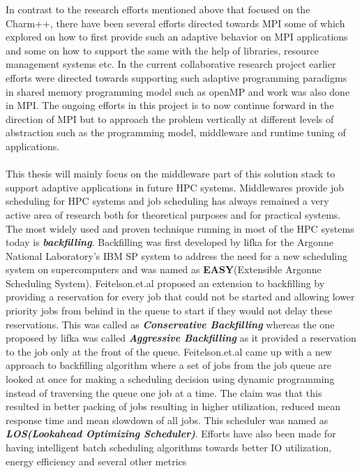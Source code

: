 In contrast to the research efforts mentioned above that focused on the Charm++, there have been several efforts directed towards MPI\cite{georgiou}\cite{travis}\cite{gladys}\cite{gonzalo}\cite{martin}\cite{gonzalo} some of which explored on how to first provide such an adaptive behavior on MPI applications and some on how to support the same with the help of libraries, resource management systems\cite{klein} etc. In the current collaborative research project earlier efforts were directed towards supporting such adaptive programming paradigms in shared memory programming model such as openMP\cite{andreas} and work was also done in MPI\cite{isaias}. The ongoing efforts in this project is to now continue forward in the direction of MPI but to approach the problem vertically at different levels of abstraction such as the programming model, middleware and runtime tuning of applications.\\ \\
This thesis will mainly focus on the middleware part of this solution stack to support adaptive applications in future HPC systems. Middlewares provide job scheduling for HPC systems and job scheduling has always remained a very active area of research both for theoretical purposes and for practical systems. The most widely used and proven technique running in most of the HPC systems today is \textbf{\textit{backfilling}}. Backfilling was first developed by lifka\cite{david} for the Argonne National Laboratory's IBM SP system to address the need for a new scheduling system on supercomputers and was named as \textbf{EASY}(Extensible Argonne Scheduling System). Feitelson.et.al\cite{ahuva} proposed an extension to backfilling by providing a reservation for every job that could not be started and allowing lower priority jobs from behind in the queue to start if they would not delay these reservations. This was called as \textbf{\textit{Conservative Backfilling}} whereas the one proposed by lifka was called \textbf{\textit{Aggressive Backfilling}} as it provided a reservation to the job only at the front of the queue. Feitelson.et.al\cite{dror} came up with a new approach to backfilling algorithm where a set of jobs from the job queue are looked at once for making a scheduling decision using dynamic programming instead of traversing the queue one job at a time. The claim was that this resulted in better packing of jobs resulting in higher utilization, reduced mean response time and mean slowdown of all jobs. This scheduler was named as \textbf{\textit{LOS(Lookahead Optimizing Scheduler)}}. Efforts have also been made for having intelligent batch scheduling algorithms towards better IO utilization, energy efficiency and several other metrics\cite{zhou}\cite{desai}\cite{yang}\cite{daniel}\cite{dongxu} \\ \\
